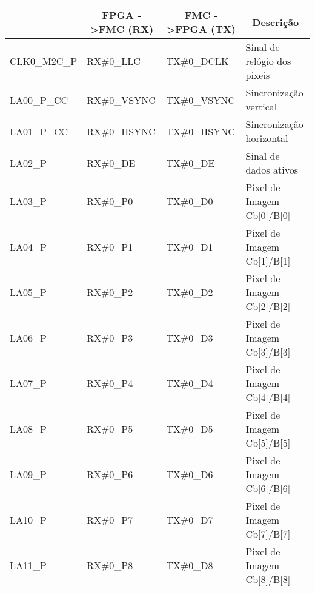 \begin{longtable}[h!]
	{@{}llll@{}}
	\hline
	\centering
	\multicolumn{1}{c}{\textbf{PORTA}} & \multicolumn{1}{c}{\textbf{FPGA -\textgreater FMC (RX)}} & \multicolumn{1}{c}{\textbf{FMC -\textgreater FPGA (TX)}} & \multicolumn{1}{c}{\textbf{Descrição}} \\ \hline \endhead
	CLK0\_M2C\_P & RX\#0\_LLC          				& TX\#0\_DCLK                          & Sinal de relógio dos pixeis 			\\ 
	LA00\_P\_CC  & RX\#0\_VSYNC         			  & TX\#0\_VSYNC                         & Sincronização vertical         		\\ 
	LA01\_P\_CC  & RX\#0\_HSYNC         		  & TX\#0\_HSYNC                         & Sincronização horizontal       		\\ 
	LA02\_P      & RX\#0\_DE            				   & TX\#0\_DE                            & Sinal de dados ativos          		\\
	LA03\_P      & RX\#0\_P0            				   & TX\#0\_D0                            & Pixel de Imagem Cb{[}0{]}/B{[}0{]}   \\
	LA04\_P      & RX\#0\_P1            		      & TX\#0\_D1                            & Pixel de Imagem Cb{[}1{]}/B{[}1{]}   \\ 
	LA05\_P      & RX\#0\_P2            			      & TX\#0\_D2                            & Pixel de Imagem Cb{[}2{]}/B{[}2{]}   \\ 
	LA06\_P      & RX\#0\_P3            			      & TX\#0\_D3                            & Pixel de Imagem Cb{[}3{]}/B{[}3{]}   \\ 
	LA07\_P      & RX\#0\_P4            			      & TX\#0\_D4                            & Pixel de Imagem Cb{[}4{]}/B{[}4{]}   \\ 
	LA08\_P      & RX\#0\_P5            			      & TX\#0\_D5                            & Pixel de Imagem Cb{[}5{]}/B{[}5{]}   \\ 
	LA09\_P      & RX\#0\_P6            		     & TX\#0\_D6                            & Pixel de Imagem Cb{[}6{]}/B{[}6{]}   \\ 
	LA10\_P      & RX\#0\_P7            			     & TX\#0\_D7                            & Pixel de Imagem Cb{[}7{]}/B{[}7{]}   \\
	LA11\_P      & RX\#0\_P8            			     & TX\#0\_D8                            & Pixel de Imagem Cb{[}8{]}/B{[}8{]}   \\ 

\end{longtable}
